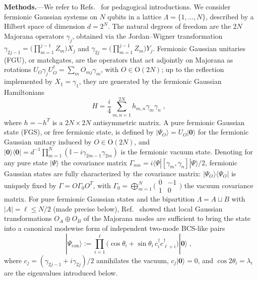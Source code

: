 \documentclass[aps,prl,twocolumn,superscriptaddress,reprint,longbibliography,nofootinbib]{revtex4-2}
\begin{document}
\textbf{Methods.}---We refer to Refs.~\cite{Mbeng2024,surace,sierant2026fermionic,sierant2026theorymatchgatecommutant} for pedagogical introductions.
We consider fermionic Gaussian systems on $N$ qubits in a lattice $\Lambda=\{1,\dots, N\}$, described by a Hilbert space of dimension $d=2^N$.
The natural degrees of freedom are the $2N$ Majorana operators $\gamma_j$, obtained via the Jordan--Wigner transformation $\gamma_{2j-1} = \bigl(\prod_{m=1}^{j-1} Z_m\bigr)X_j$ and $\gamma_{2j} = \bigl(\prod_{m=1}^{j-1} Z_m\bigr)Y_j$.
Fermionic Gaussian unitaries (FGU), or matchgates, are the operators that act adjointly on Majorana as rotations $U_O\gamma_j U_O^\dagger = \sum_{m}O_{mj}\gamma_m$, with $O\in \mathrm{O}(2N)$; up to the reflection implemented by $X_1=\gamma_1$, they are generated by the fermionic Gaussian Hamiltonians
\begin{equation}
    H= \frac{i}{4}\sum_{m,n=1}^{2N} h_{m,n} \gamma_m\gamma_n\;,\label{eq:ham}
\end{equation}
where $h=-h^T$ is a $2N\times 2N$ antisymmetric matrix.
A pure fermionic Gaussian state (FGS), or free fermionic state, is defined by $|\Psi_O\rangle=U_O|\mathbf{0}\rangle$ for the fermionic Gaussian unitary induced by $O\in \mathrm{O}(2N)$, and $|\mathbf{0}\rangle\langle\mathbf{0}| = d^{-1}\prod_{m=1}^{N}(\mathbb{I}-i\gamma_{2m-1}\gamma_{2m})$ is the fermionic vacuum state.
Denoting for any pure state $|\Psi\rangle$ the covariance matrix $\Gamma_{mn}=i\langle \Psi|[\gamma_m,\gamma_n]|\Psi\rangle/2$, fermionic Gaussian states are fully characterized by the covariance matrix: $|\Psi_O\rangle\langle \Psi_O|$ is uniquely fixed by $\Gamma= O\Gamma_0 O^T$, with $\Gamma_0= \bigoplus_{m=1}^N \bigl(\begin{smallmatrix} 0 &-1 \\1&0 \end{smallmatrix}\bigr)$ the vacuum covariance matrix.
For pure fermionic Gaussian states and the bipartition $\Lambda=A\sqcup B$ with $|A|=\ell\le N/2$ (made precise below), Ref.~\cite{BoteroReznik2004} showed that local Gaussian transformations $O_A\oplus O_B$ of the Majorana modes are sufficient to bring the state into a canonical modewise form of independent two-mode BCS-like pairs
\begin{equation}
     |\Psi_{\mathrm{can}}\rangle
:= \prod_{i=1}^{\ell}\bigl(\cos\theta_i+\sin\theta_i\,c_i^\dagger c_{\ell+i}^\dagger\bigr)|\mathbf{0}\rangle\;,
\label{eq:can_form}
\end{equation}
where $c_j=(\gamma_{2j-1}+i\gamma_{2j})/2$ annihilates the vacuum, $c_j|\mathbf{0}\rangle=0$, and $\cos2\theta_i=\lambda_i$ are the eigenvalues introduced below.
\end{document}
